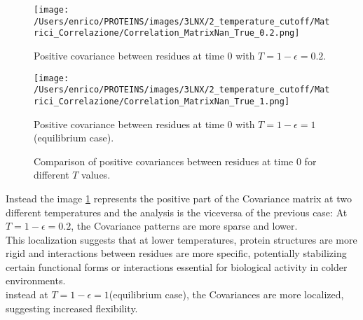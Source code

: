 \documentclass[English, Lau, oneside]{sapthesis}
\begin{document}
\newpage
\begin{figure}[h!]
    \centering
    \begin{minipage}{0.49\textwidth}
        \centering
        \texttt{[image: /Users/enrico/PROTEINS/images/3LNX/2\_temperature\_cutoff/Matrici\_Correlazione/Correlation\_MatrixNan\_True\_0.2.png]}
        \caption{Positive covariance between residues at time 0 with \( T = 1-\epsilon = 0.2\).}
        
    \end{minipage}
    \hfill
    \begin{minipage}{0.49\textwidth}
        \centering
        \texttt{[image: /Users/enrico/PROTEINS/images/3LNX/2\_temperature\_cutoff/Matrici\_Correlazione/Correlation\_MatrixNan\_True\_1.png]}
        \caption{Positive covariance between residues at time 0 with \( T = 1-\epsilon =1\) (equilibrium case).}
        
    \end{minipage}
    \caption{Comparison of positive covariances between residues at time 0 for different $ T$ values.}
    \label{fig:Covariance_positive_comparison_out}
\end{figure}

Instead the image \ref{fig:Covariance_positive_comparison_out} represents the positive part of the Covariance matrix at two different temperatures and the analysis is the viceversa of the previous case:
At \( T = 1-\epsilon = 0.2\), the Covariance patterns are more sparse and lower.\\
This localization suggests that at lower temperatures, protein structures are more rigid and interactions between residues are more specific, potentially stabilizing certain functional forms or interactions essential for biological activity in colder environments.\\
instead at \( T = 1-\epsilon =1\)(equilibrium case), the Covariances are more localized, suggesting increased flexibility.\\
\end{document}
